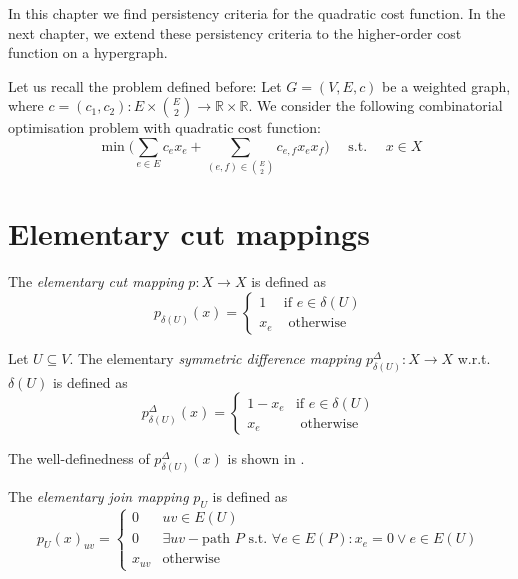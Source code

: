 In this chapter we find persistency criteria for the quadratic cost function. In the next chapter, we extend these persistency criteria to the higher-order cost function on a hypergraph. 

Let us recall the problem defined before:
Let $G=(V,E,c)$ be a weighted graph, where $c=(c_1,c_2): E \times \binom{E}{2} \to \mathbb{R} \times \mathbb{R}$. 
We consider the following combinatorial optimisation problem with quadratic cost function: 
\begin{equation}
\tag{$P_1$}
 \min \Big(\sum_{e \in E} c_e x_e + \sum_{(e,f) \in {E \choose 2}} c_{e,f} x_e x_f \Big)  \quad \text{ s.t. } \quad x \in X
\end{equation}

\section{Elementary cut mappings}
\begin{definition}
The \textit{elementary cut mapping} $p:X \to X$ is defined as
\[ p_{\delta(U)}(x)= 
\begin{cases}
    1& \text{if } e \in \delta(U) \\
    x_e& \text{ otherwise }
\end{cases} \] 
\end{definition}

\begin{definition} Let $U \subseteq V$. The elementary \textit{symmetric difference mapping} $p^{\Delta}_{\delta(U)}: X \to X$ w.r.t. $\delta(U)$ is defined as 
\[ p^{\Delta}_{\delta(U)}(x)=
\begin{cases}
    1-x_e& \text{if } e \in \delta(U) \\
    x_e& \text{ otherwise }
\end{cases} \]
\end{definition}
The well-definedness of $p^{\Delta}_{\delta(U)}(x)$ is shown in \cite{Comb}. 
\begin{definition}
The \textit{elementary join mapping} $p_U$ is defined as 
\begin{equation*}
    p_U(x)_{uv}=
    \begin{cases}
        0& uv \in E(U) \\
        0 & \exists uv-\text{path } P \text{ s.t. } \forall e \in E(P): x_e=0 \lor e \in E(U) \\
        x_{uv} & \text{otherwise}
    \end{cases}
\end{equation*}
\end{definition}
